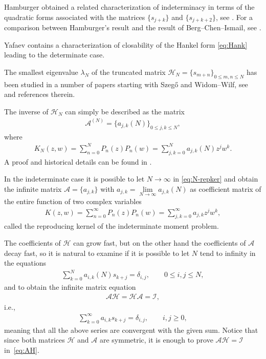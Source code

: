 \documentclass[pdftex]{sigma}
\numberwithin{equation}{section}
\begin{document}
Hamburger obtained a related characterization of indeterminacy in terms of the quadratic forms associated with the matrices $\{s_{j+k}\}$ and $\{s_{j+k+2}\}$, see \cite[p.~70]{S:T}. For a comparison between Hamburger's result and the result of Berg--Chen--Ismail, see \cite{B:C:I}.

Yafaev \cite{Y} contains a characterization of closability of the Hankel form \eqref{eq:Hank} leading to the determinate case.

The smallest eigenvalue $\lambda_N$ of the truncated matrix $\mathcal{H}_N=\{s_{m+n}\}_{0\le m,n\le N}$ has been studied in a number of papers starting with Szeg\H{o} and Widom--Wilf, see~\cite{B:S1} and references therein.

The inverse of $\mathcal H_N$ can simply be described as the matrix
\begin{gather*}
\mathcal A^{(N)}=\{a_{j,k}(N)\}_{0\le j,k\le N},
\end{gather*}
where
\begin{gather}\label{eq:N-repker}
K_N(z,w)=\sum_{n=0}^NP_n(z)P_n(w)=\sum_{j,k=0}^N a_{j,k}(N)z^jw^k.
\end{gather}
A proof and historical details can be found in \cite[Theorem~1.1]{B:S1}.

In the indeterminate case it is possible to let $N\to \infty$ in \eqref{eq:N-repker} and obtain the infinite matrix $\mathcal A=\{a_{j,k}\}$ with $a_{j,k}=\lim\limits_{N\to\infty}a_{j,k}(N)$ as coefficient matrix of the entire function of two complex variables
\begin{gather*}
K(z,w)=\sum_{n=0}^\infty P_n(z)P_n(w)=\sum_{j,k=0}^\infty a_{j,k}z^jw^k,
\end{gather*}
called the reproducing kernel of the indeterminate moment problem.

The coefficients of $\mathcal H$ can grow fast, but on the other hand the coefficients of $\mathcal A$ decay fast, so it is natural to examine if it is possible to let $N$ tend to infinity in the equations
\begin{gather*}
\sum_{k=0}^N a_{i,k}(N)s_{k+j}=\delta_{i,j},\qquad 0\le i,j\le N,
\end{gather*}
and to obtain the infinite matrix equation
\begin{gather}\label{eq:AH}
\mathcal A\mathcal H=\mathcal H\mathcal A=\mathcal I,
\end{gather}
i.e.,
\begin{gather}\label{eq:AH1}
\sum_{k=0}^\infty a_{i,k}s_{k+j} =\delta_{i,j},\qquad i,j \ge 0,
\end{gather}
meaning that all the above series are convergent with the given sum.
Notice that since both matrices $\mathcal H$ and $\mathcal A$ are symmetric, it is enough to prove $\mathcal A\mathcal H=\mathcal I$ in~\eqref{eq:AH}.
\end{document}
